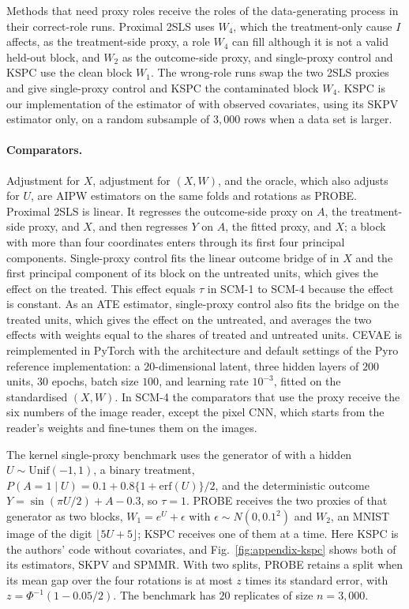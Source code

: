 Methods that need proxy roles receive the roles of the data-generating process in their correct-role runs. Proximal 2SLS uses $W_4$, which the treatment-only cause $I$ affects, as the treatment-side proxy, a role $W_4$ can fill although it is not a valid held-out block, and $W_2$ as the outcome-side proxy, and single-proxy control and KSPC use the clean block $W_1$. The wrong-role runs swap the two 2SLS proxies and give single-proxy control and KSPC the contaminated block $W_4$. KSPC is our implementation of the estimator of \citet{xu2025kernel} with observed covariates, using its SKPV estimator only, on a random subsample of $3{,}000$ rows when a data set is larger.

\paragraph{Comparators.}Adjustment for $X$, adjustment for $(X,W)$, and the oracle, which also adjusts for $U$, are AIPW estimators on the same folds and rotations as PROBE. Proximal 2SLS is linear. It regresses the outcome-side proxy on $A$, the treatment-side proxy, and $X$, and then regresses $Y$ on $A$, the fitted proxy, and $X$; a block with more than four coordinates enters through its first four principal components. Single-proxy control fits the linear outcome bridge of \citet{park2024single} in $X$ and the first principal component of its block on the untreated units, which gives the effect on the treated. This effect equals $\tau$ in SCM-1 to SCM-4 because the effect is constant. As an ATE estimator, single-proxy control also fits the bridge on the treated units, which gives the effect on the untreated, and averages the two effects with weights equal to the shares of treated and untreated units. CEVAE is reimplemented in PyTorch with the architecture and default settings of the Pyro reference implementation: a $20$-dimensional latent, three hidden layers of $200$ units, $30$ epochs, batch size $100$, and learning rate $10^{-3}$, fitted on the standardised $(X,W)$. In SCM-4 the comparators that use the proxy receive the six numbers of the image reader, except the pixel CNN, which starts from the reader's weights and fine-tunes them on the images.

The kernel single-proxy benchmark uses the generator of \citet{xu2025kernel} with a hidden $U\sim\mathrm{Unif}(-1,1)$, a binary treatment, $P(A=1\mid U)=0.1+0.8\{1+\mathrm{erf}(U)\}/2$, and the deterministic outcome $Y=\sin(\pi U/2)+A-0.3$, so $\tau=1$. PROBE receives the two proxies of that generator as two blocks, $W_1=e^U+\epsilon$ with $\epsilon\sim N(0,0.1^2)$ and $W_2$, an MNIST image of the digit $\lfloor 5U+5\rfloor$; KSPC receives one of them at a time. Here KSPC is the authors' code without covariates, and Fig.~\ref{fig:appendix-kspc} shows both of its estimators, SKPV and SPMMR. With two splits, PROBE retains a split when its mean gap over the four rotations is at most $z$ times its standard error, with $z=\Phi^{-1}(1-0.05/2)$. The benchmark has $20$ replicates of size $n=3{,}000$.

